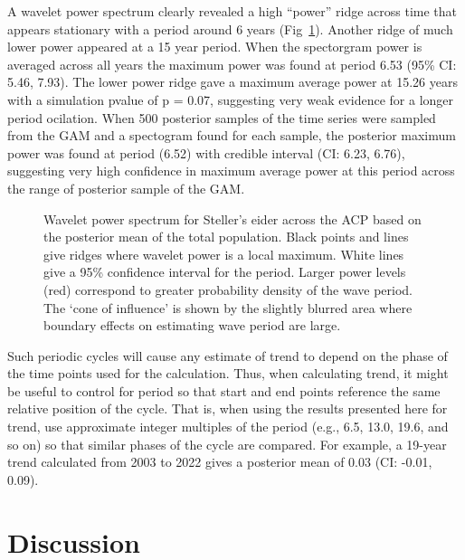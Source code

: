\documentclass[
  10pt,
  letterpaper,
]{article}
\begin{document}
A wavelet power spectrum clearly revealed a high ``power'' ridge across
time that appears stationary with a period around 6 years
(Fig~\ref{fig-wavelet}). Another ridge of much lower power appeared at a
15 year period. When the spectorgram power is averaged across all years
the maximum power was found at period 6.53 (95\% CI: 5.46, 7.93). The
lower power ridge gave a maximum average power at 15.26 years with a
simulation pvalue of p = 0.07, suggesting very weak evidence for a
longer period ocilation. When 500 posterior samples of the time series
were sampled from the GAM and a spectogram found for each sample, the
posterior maximum power was found at period (6.52) with credible
interval (CI: 6.23, 6.76), suggesting very high confidence in maximum
average power at this period across the range of posterior sample of the
GAM.

\begin{figure}

\caption{\label{fig-wavelet}Wavelet power spectrum for Steller's eider
across the ACP based on the posterior mean of the total population.
Black points and lines give ridges where wavelet power is a local
maximum. White lines give a 95\% confidence interval for the period.
Larger power levels (red) correspond to greater probability density of
the wave period. The `cone of influence' is shown by the slightly
blurred area where boundary effects on estimating wave period are
large.}

\end{figure}%

Such periodic cycles will cause any estimate of trend to depend on the
phase of the time points used for the calculation. Thus, when
calculating trend, it might be useful to control for period so that
start and end points reference the same relative position of the cycle.
That is, when using the results presented here for trend, use
approximate integer multiples of the period (e.g., 6.5, 13.0, 19.6, and
so on) so that similar phases of the cycle are compared. For example, a
19-year trend calculated from 2003 to 2022 gives a posterior mean of
0.03 (CI: -0.01, 0.09).

\section{Discussion}\label{discussion}
\end{document}

